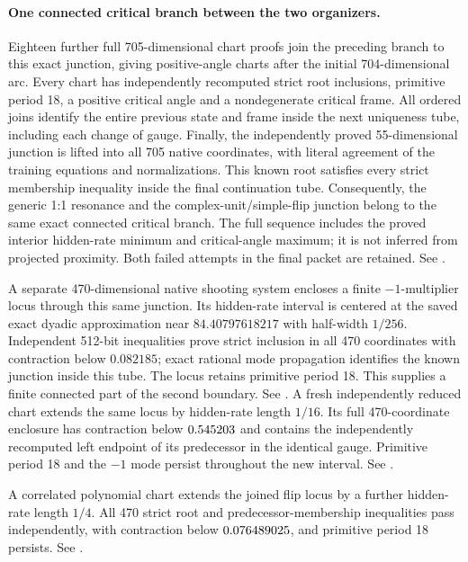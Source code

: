 \documentclass[11pt,letterpaper]{article}
\begin{document}
\paragraph{One connected critical branch between the two organizers.}
Eighteen further full 705-dimensional chart proofs join the preceding branch to
this exact junction, giving \nPALVisualCharts{} positive-angle charts after the initial
704-dimensional arc. Every chart has independently recomputed strict root
inclusions, primitive period 18, a positive critical angle and a nondegenerate
critical frame. All ordered joins identify the entire previous state and frame
inside the next uniqueness tube, including each change of gauge.
Finally, the independently proved 55-dimensional junction is lifted into all
705 native coordinates, with literal agreement of the training equations and
normalizations. This known root satisfies every strict membership inequality
inside the final continuation tube. Consequently, the generic 1:1 resonance and
the complex-unit/simple-flip junction belong to the same exact connected critical
branch. The full sequence includes the proved interior hidden-rate minimum and
critical-angle maximum; it is not inferred from projected proximity. Both failed attempts in the final packet are retained. See
.

A separate 470-dimensional native shooting system encloses a finite
$-1$-multiplier locus through this same junction. Its hidden-rate interval is
centered at the saved exact dyadic approximation near $84.40797618217$ with
half-width $1/256$. Independent 512-bit inequalities prove strict inclusion in
all 470 coordinates with contraction below $0.082185$; exact rational mode
propagation identifies the known junction inside this tube. The locus retains
primitive period 18. This supplies a finite connected part of the second
boundary. See .
A fresh independently reduced chart extends the same locus by hidden-rate
length $1/16$. Its full 470-coordinate enclosure has contraction below
$0.545203$ and contains the independently recomputed left
endpoint of its predecessor in the identical gauge. Primitive period 18 and
the $-1$ mode persist throughout the new interval. See
.

A correlated polynomial chart extends the joined flip locus by a further
hidden-rate length $1/4$. All 470 strict root and predecessor-membership
inequalities pass independently, with contraction below
$0.076489025$, and primitive period 18 persists.
See .
\end{document}
